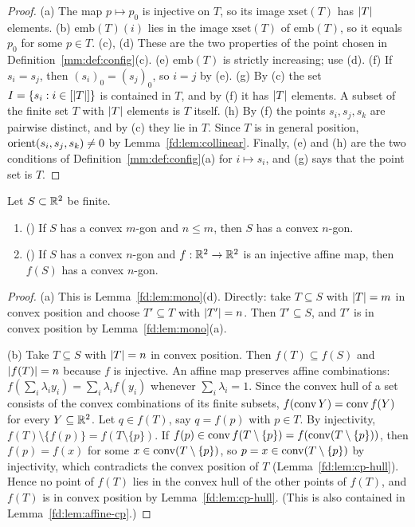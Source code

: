 \begin{proof}
(a) The map $p\mapsto p_0$ is injective on $T$, so its image $\mathrm{xset}(T)$ has $\lvert T\rvert$ elements.
(b) $\mathrm{emb}(T)(i)$ lies in the image $\mathrm{xset}(T)$ of $\mathrm{emb}(T)$, so it equals $p_0$ for
some $p\in T$.
(c), (d) These are the two properties of the point chosen in Definition~\ref{mm:def:config}(c).
(e) $\mathrm{emb}(T)$ is strictly increasing; use (d).
(f) If $s_i=s_j$, then $(s_i)_0=(s_j)_0$, so $i=j$ by (e).
(g) By (c) the set $I=\{s_i:i\in[\lvert T\rvert]\}$ is contained in $T$, and by (f) it has $\lvert T\rvert$ elements. A
subset of the finite set $T$ with $\lvert T\rvert$ elements is $T$ itself.
(h) By (f) the points $s_i,s_j,s_k$ are pairwise distinct, and by (c) they lie in $T$. Since $T$ is in
general position, $\operatorname{orient}(s_i,s_j,s_k)\ne0$ by Lemma~\ref{fd:lem:collinear}.
Finally, (e) and (h) are the two conditions of Definition~\ref{mm:def:config}(a) for $i\mapsto s_i$, and
(g) says that the point set is $T$.
\end{proof}

\begin{lemma}\label{mm:lem:ngon}
Let $S\subset\mathbb R^2$ be finite.
\begin{enumerate}[label=(\alph*)]
\item () If $S$ has a convex $m$-gon and $n\le m$, then $S$ has a convex
  $n$-gon.
\item () If $S$ has a convex $n$-gon and $f:\mathbb R^2\to\mathbb R^2$ is an injective
  affine map, then $f(S)$ has a convex $n$-gon.
\end{enumerate}
\end{lemma}

\begin{proof}
(a) This is Lemma~\ref{fd:lem:mono}(d). Directly: take $T\subseteq S$ with $\lvert T\rvert=m$ in convex
position and choose $T'\subseteq T$ with $\lvert T'\rvert=n$. Then $T'\subseteq S$, and $T'$ is in convex
position by Lemma~\ref{fd:lem:mono}(a).

(b) Take $T\subseteq S$ with $\lvert T\rvert=n$ in convex position. Then $f(T)\subseteq f(S)$ and
$\lvert f(T)\rvert=n$ because $f$ is injective. An affine map preserves affine combinations:
$f(\sum_i\lambda_iy_i)=\sum_i\lambda_if(y_i)$ whenever $\sum_i\lambda_i=1$. Since the convex hull of a set
consists of the convex combinations of its finite subsets, $f(\operatorname{conv} Y)=\operatorname{conv} f(Y)$ for every
$Y\subseteq\mathbb R^2$. Let $q\in f(T)$, say $q=f(p)$ with $p\in T$. By injectivity,
$f(T)\setminus\{f(p)\}=f(T\setminus\{p\})$. If $f(p)\in\operatorname{conv} f(T\setminus\{p\})=f(\operatorname{conv}(T\setminus\{p\}))$,
then $f(p)=f(x)$ for some $x\in\operatorname{conv}(T\setminus\{p\})$, so $p=x\in\operatorname{conv}(T\setminus\{p\})$ by injectivity,
which contradicts the convex position of $T$ (Lemma~\ref{fd:lem:cp-hull}). Hence no point of $f(T)$ lies
in the convex hull of the other points of $f(T)$, and $f(T)$ is in convex position by
Lemma~\ref{fd:lem:cp-hull}. (This is also contained in Lemma~\ref{fd:lem:affine-cp}.)
\end{proof}


